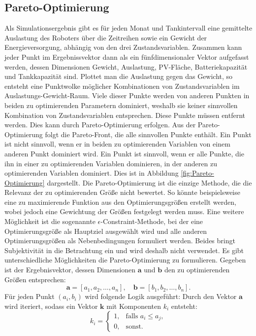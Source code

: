 \subsection{Pareto-Optimierung}
Als Simulationsergebnis gibt es für jeden Monat und Tankintervall eine gemittelte Auslastung des Roboters über die Zeitreihen sowie ein Gewicht der Energieversorgung, abhängig von den drei Zustandsvariablen. 
Zusammen kann jeder Punkt im Ergebnissvektor dann als ein fünfdimensionaler Vektor aufgefasst werden, dessen Dimensionen Gewicht, Auslastung, PV-Fläche, Batteriekapazität und Tankkapazität sind. 
Plottet man die Auslastung gegen das Gewicht, so entsteht eine Punktwolke möglicher Kombinationen von Zustandsvariablen im Auslastungs-Gewicht-Raum. Viele dieser Punkte werden von anderen Punkten in beiden zu optimierenden Parametern dominiert, weshalb sie keiner sinnvollen Kombination von Zustandsvariablen entsprechen. Diese Punkte müssen entfernt werden. Dies kann durch Pareto-Optimierung erfolgen. Aus der Pareto-Optimierung folgt die Pareto-Front, die alle sinnvollen Punkte enthält.
Ein Punkt ist nicht sinnvoll, wenn er in beiden zu optimierenden Variablen von einem anderen Punkt dominiert wird. 
Ein Punkt ist sinnvoll, wenn er alle Punkte, die ihn in einer zu optimierenden Variablen dominieren, in der anderen zu optimierenden Variablen dominiert. Dies ist in Abbildung \ref{fig:Pareto-Optimierung} dargestellt. Die Pareto-Optimierung ist die einzige Methode, die die Relevanz der zu optimierenden Größe nicht bewertet. So könnte beispielsweise eine zu maximierende Funktion aus den Optimierungsgrößen erstellt werden, wobei jedoch eine Gewichtung der Größen festgelegt werden muss. Eine weitere Möglichkeit ist die sogenannte $\epsilon$-Constraint-Methode, bei der eine Optimierungsgröße als Hauptziel ausgewählt wird und alle anderen Optimierungsgrößen als Nebenbedingungen formuliert werden. Beides bringt Subjektivität in die Betrachtung ein und wird deshalb nicht verwendet. Es gibt unterschiedliche Möglichkeiten die Pareto-Optimierung zu formulieren. Gegeben ist der Ergebnisvektor, dessen Dimensionen $\mathbf{a}$ und $\mathbf{b}$ den zu optimierenden Größen entsprechen:
\begin{equation}
\mathbf{a} = [a_1, a_2, \dots, a_n], \quad
\mathbf{b} = [b_1, b_2, \dots, b_n].
\end{equation}
Für jeden Punkt $(a_i, b_i)$ wird folgende Logik ausgeführt:
Durch den Vektor $\mathbf{a}$ wird iteriert, sodass ein Vektor $\mathbf{k}$ mit Komponenten $k_i$ entsteht:
\begin{equation}
k_i =
\begin{cases}
1, & \text{falls } a_i \leq a_j, \\[1ex]
0, & \text{sonst.}
\end{cases}
\end{equation}
